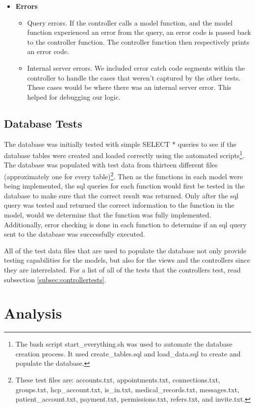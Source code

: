 \begin{itemize}
\begin{itemize}
\end{itemize}
\item \textbf{Errors}
\begin{itemize} 
\item Query errors. If the controller calls a model function, and the model function experienced an error from the query, an error code is passed back to the controller function. The controller function then respectively prints an error code. 
\item Internal server errors. We included error catch code segments within the controller to handle the cases that weren't captured by the other tests. These cases would be where there was an internal server error. This helped for debugging our logic.  
\end{itemize}
\end{itemize}


\section{Database Tests}
The database was initially tested with simple SELECT * queries to see if the database tables were created and loaded correctly using the automated scripts\footnote{The bash script start\_everything.sh was used to automate the database creation process.  It used create\_tables.sql and load\_data.sql to create and populate the database.}. The database was populated with test data from thirteen different files (approximately one for every table)\footnote{These test files are: accounts.txt, appointments.txt, connections.txt, groups.txt, hcp\_account.txt, is\_in.txt, medical\_records.txt, messages.txt, patient\_account.txt, payment.txt, permissions.txt, refers.txt, and invite.txt.}.  Then as the functions in each model were being implemented, the sql queries for each function would first be tested in the database to make sure that the correct result was returned.  Only after the sql query was tested and returned the correct information to the function in the model, would we determine that the function was fully implemented.  Additionally, error checking is done in each function to determine if an sql query sent to the database was successfully executed.

All of the test data files that are used to populate the database not only provide testing capabilities for the models, but also for the views and the controllers since they are interrelated.  For a list of all of the tests that the controllers test, read subsection \ref{subsec:controllertests}.


\chapter{Analysis}